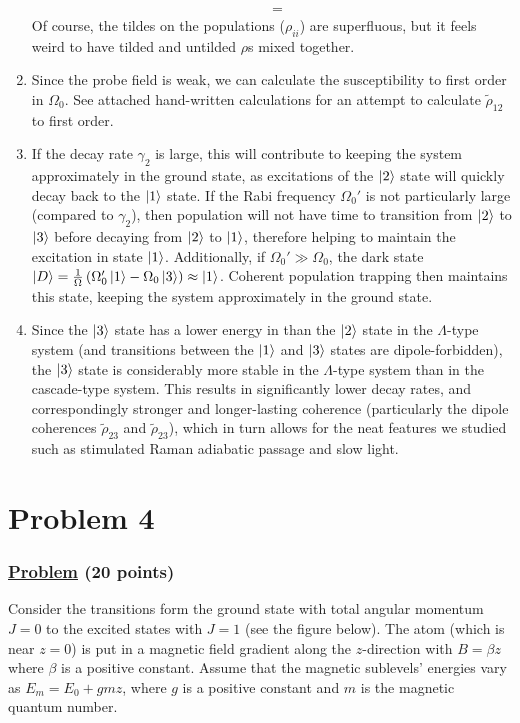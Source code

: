 \documentclass[12pt]{article}
\begin{document}
\begin{enumerate}[label=(\alph*)]
\begin{align*}
        &= 
    \end{align*}
    Of course, the tildes on the populations ($\rho_{ii}$) are superfluous, but it feels weird to have tilded and untilded $\rho$s mixed together.
    \item Since the probe field is weak, we can calculate the susceptibility to first order in $\Omega_0$. See attached hand-written calculations for an attempt to calculate $\tilde{\rho}_{12}$ to first order.
    \item If the decay rate $\gamma_2$ is large, this will contribute to keeping the system approximately in the ground state, as excitations of the $\ket{2}$ state will quickly decay back to the $\ket{1}$ state.
    If the Rabi frequency $\Omega_0'$ is not particularly large (compared to $\gamma_2$), then population will not have time to transition from $\ket{2}$ to $\ket{3}$ before decaying from $\ket{2}$ to $\ket{1}$, therefore helping to maintain the excitation in state $\ket{1}$.
    Additionally, if $\Omega_0' \gg \Omega_0$, the dark state $\ket{D} = \frac{1}{\Omega}\left(\Omega_0'\ket{1} - \Omega_0\ket{3}\right) \approx \ket{1}$. Coherent population trapping then maintains this state, keeping the system approximately in the ground state.
    \item Since the $\ket{3}$ state has a lower energy in than the $\ket{2}$ state in the $\Lambda$-type system (and transitions between the $\ket{1}$ and $\ket{3}$ states are dipole-forbidden), the $\ket{3}$ state is considerably more stable in the $\Lambda$-type system than in the cascade-type system.
    This results in significantly lower decay rates, and correspondingly stronger and longer-lasting coherence (particularly the dipole coherences $\tilde{\rho}_{23}$ and $\tilde{\rho}_{23}$), which in turn allows for the neat features we studied such as stimulated Raman adiabatic passage and slow light.
\end{enumerate}


\section*{Problem 4}
\subsubsection*{\underline{Problem} (20 points)}
Consider the transitions form the ground state with total angular momentum $J=0$ to the excited states with $J=1$ (see the figure below). The atom (which is near $z=0$) is put in a magnetic field gradient along the $z$-direction with $B=\beta z$ where $\beta$ is a positive constant. 
Assume that the magnetic sublevels' energies vary as $E_m = E_0 + gmz$, where $g$ is a positive constant and $m$ is the magnetic quantum number.
\end{document}
